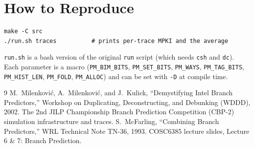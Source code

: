 \documentclass[11pt]{article}
\begin{document}
\section{How to Reproduce}

\begin{verbatim}
make -C src
./run.sh traces          # prints per-trace MPKI and the average
\end{verbatim}

\noindent \texttt{run.sh} is a bash version of the original \texttt{run} script
(which needs \texttt{csh} and \texttt{dc}). Each parameter is a macro
(\texttt{PM\_BIM\_BITS}, \texttt{PM\_SET\_BITS}, \texttt{PM\_WAYS},
\texttt{PM\_TAG\_BITS}, \texttt{PM\_HIST\_LEN}, \texttt{PM\_FOLD},
\texttt{PM\_ALLOC}) and can be set with \texttt{-D} at compile time.

\begin{thebibliography}{9}
 M.~Milenkovi\'c, A.~Milenkovi\'c, and J.~Kulick,
  ``Demystifying Intel Branch Predictors,'' Workshop on Duplicating,
  Deconstructing, and Debunking (WDDD), 2002.
 The 2nd JILP Championship Branch Prediction Competition (CBP-2)
  simulation infrastructure and traces.
 S.~McFarling, ``Combining Branch Predictors,'' WRL Technical Note
  TN-36, 1993.
 COSC6385 lecture slides, Lecture 6 \& 7: Branch Prediction.
\end{thebibliography}
\end{document}
